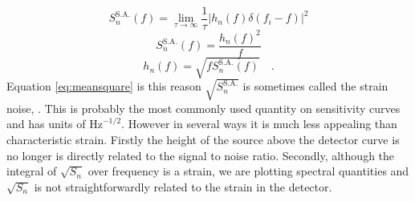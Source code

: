 \begin{equation} S^{\textrm{S.A.}}_{n}(f)=\lim_{\tau \rightarrow \infty}\frac{1}{\tau}\left| h_{n}(f)\delta (f_{i}-f) \right|^{2} \end{equation}
\begin{equation} S^{\textrm{S.A.}}_{n}(f)=\frac{h_{n}(f)^{2}}{f} \end{equation}
\begin{equation} h_{n}(f)=\sqrt{fS_{n}^{\textrm{S.A.}}(f)} \quad . \end{equation}
Equation \ref{eq:meansquare} is this reason $\sqrt{S^{\textrm{S.A.}}_{n}}$ is sometimes called the strain noise, \cite{Phinney}. This is probably the most commonly used quantity on sensitivity curves and has units of $\textrm{Hz}^{-1/2}$. However in several ways it is much less appealing than characteristic strain. Firstly the height of the source above the detector curve is no longer is directly related to the signal to noise ratio. Secondly, although the integral of $\sqrt{S_{n}}$ over frequency is a strain, we are plotting spectral quantities and $\sqrt{S_{n}}$ is not straightforwardly related to the strain in the detector.


